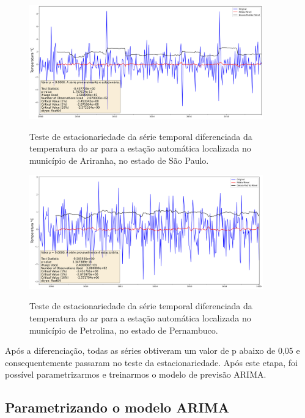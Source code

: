 \begin{figure}[H]
    \centering
    \caption{Teste de estacionariedade da série temporal diferenciada da temperatura do ar para a estação automática localizada no município de Ariranha, no estado de São Paulo.}
    \includegraphics[width=0.9\textwidth]{figuras/dickey_fuller_diff_A736.png}
    \label{fig:estacionariedade_seria_diferenciada_2}
\end{figure}

\begin{figure}[H]
    \centering
    \caption{Teste de estacionariedade da série temporal diferenciada da temperatura do ar para a estação automática localizada no município de Petrolina, no estado de Pernambuco.}
    \includegraphics[width=0.9\textwidth]{figuras/dickey_fuller_diff_712f3e11658051636f09732a60fb3c1b.png}
    \label{fig:estacionariedade_seria_diferenciada_3}
\end{figure}

Após a diferenciação, todas as séries obtiveram um valor de p abaixo de 0,05 e consequentemente passaram no teste da estacionariedade. Após este etapa, foi possível parametrizarmos e treinarmos o modelo de previsão ARIMA. 

\subsection{Parametrizando o modelo ARIMA}

